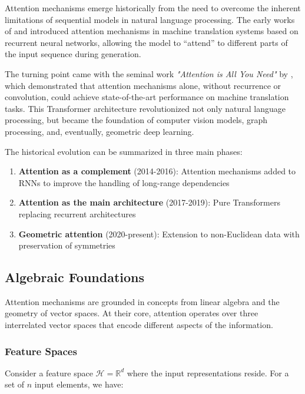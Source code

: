 Attention mechanisms emerge historically from the need to overcome the inherent limitations of sequential models in natural language processing. The early works of \citet{bahdanau2014neural} and \citet{luong2015effective} introduced attention mechanisms in machine translation systems based on recurrent neural networks, allowing the model to ``attend'' to different parts of the input sequence during generation.

The turning point came with the seminal work \textit{"Attention is All You Need"} by \citet{vaswani2017attentionneed}, which demonstrated that attention mechanisms alone, without recurrence or convolution, could achieve state-of-the-art performance on machine translation tasks. This \gls{Transformer} architecture revolutionized not only natural language processing, but became the foundation of computer vision models, graph processing, and, eventually, geometric deep learning.

The historical evolution can be summarized in three main phases:

\begin{enumerate}
    \item \textbf{Attention as a complement} (2014-2016): Attention mechanisms added to \glspl{RNN} to improve the handling of long-range dependencies
    \item \textbf{Attention as the main architecture} (2017-2019): Pure \glspl{Transformer} replacing recurrent architectures
    \item \textbf{Geometric attention} (2020-present): Extension to non-Euclidean data with preservation of symmetries
\end{enumerate}

\subsection{Algebraic Foundations}\label{subsec:fundamentos_algebraicos_atencion}

Attention mechanisms are grounded in concepts from linear algebra and the geometry of vector spaces. At their core, attention operates over three interrelated vector spaces that encode different aspects of the information.

\subsubsection{Feature Spaces}\label{subsubsec:espacios_caracteristicas}

Consider a feature space $\mathcal{H} = \mathbb{R}^d$ where the input representations reside. For a set of $n$ input elements, we have:

